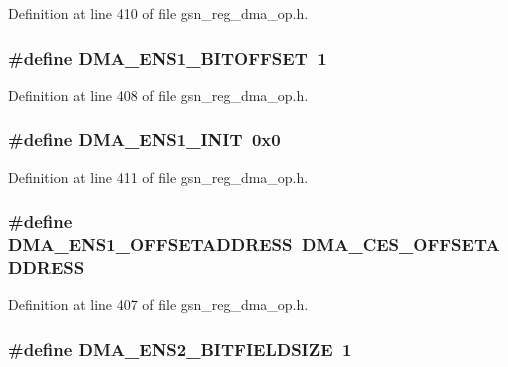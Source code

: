 Definition at line 410 of file gsn\_\-reg\_\-dma\_\-op.h.

\hypertarget{a00547_a8a065a913f8488a836ab4e176aaa5ca8}{
\subsubsection[{DMA\_\-ENS1\_\-BITOFFSET}]{\setlength{\rightskip}{0pt plus 5cm}\#define DMA\_\-ENS1\_\-BITOFFSET~1}}
\label{a00547_a8a065a913f8488a836ab4e176aaa5ca8}


Definition at line 408 of file gsn\_\-reg\_\-dma\_\-op.h.

\hypertarget{a00547_a5a405b1664866a600b78c2af3b525002}{
\subsubsection[{DMA\_\-ENS1\_\-INIT}]{\setlength{\rightskip}{0pt plus 5cm}\#define DMA\_\-ENS1\_\-INIT~0x0}}
\label{a00547_a5a405b1664866a600b78c2af3b525002}


Definition at line 411 of file gsn\_\-reg\_\-dma\_\-op.h.

\hypertarget{a00547_ae876a147c5a848a5f1cb93e66160340d}{
\subsubsection[{DMA\_\-ENS1\_\-OFFSETADDRESS}]{\setlength{\rightskip}{0pt plus 5cm}\#define DMA\_\-ENS1\_\-OFFSETADDRESS~DMA\_\-CES\_\-OFFSETADDRESS}}
\label{a00547_ae876a147c5a848a5f1cb93e66160340d}


Definition at line 407 of file gsn\_\-reg\_\-dma\_\-op.h.

\hypertarget{a00547_a711a0f3d2ef3380b5cdddc1d56bf5e64}{
\subsubsection[{DMA\_\-ENS2\_\-BITFIELDSIZE}]{\setlength{\rightskip}{0pt plus 5cm}\#define DMA\_\-ENS2\_\-BITFIELDSIZE~1}}
\label{a00547_a711a0f3d2ef3380b5cdddc1d56bf5e64}


